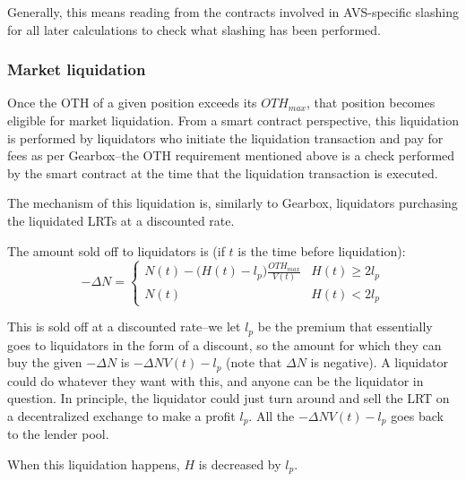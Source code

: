 \documentclass{article}
\begin{document}
Generally, this means reading from the contracts involved in AVS-specific slashing for all later calculations to check what slashing has been performed.

\subsubsection{Market liquidation}
Once the OTH of a given position exceeds its $\textit{OTH}_\textit{max}$, that position becomes eligible for market liquidation. From a smart contract perspective, this liquidation is performed by liquidators who initiate the liquidation transaction and pay for fees as per Gearbox--the OTH requirement mentioned above is a check performed by the smart contract at the time that the liquidation transaction is executed.

The mechanism of this liquidation is, similarly to Gearbox, liquidators purchasing the liquidated LRTs at a discounted rate.

The amount sold off to liquidators is (if $t$ is the time before liquidation):
$$
-\Delta N = \begin{cases}
N(t) -\Big(H(t) - l_p\Big) \frac{\textit{OTH}_\textit{max}}{V(t)} & H(t) \geq 2l_p \\
N(t) & H(t) < 2l_p
\end{cases}
$$

This is sold off at a discounted rate--we let $l_p$ be the premium that essentially goes to liquidators in the form of a discount, so the amount for which they can buy the given $-\Delta N$ is $-\Delta N V(t) - l_p$ (note that $\Delta N$ is negative). A liquidator could do whatever they want with this, and anyone can be the liquidator in question. In principle, the liquidator could just turn around and sell the LRT on a decentralized exchange to make a profit $l_p$.
All the $-\Delta N V(t) - l_p$ goes back to the lender pool.

When this liquidation happens, $H$ is decreased by $l_p$.

\end{document}
